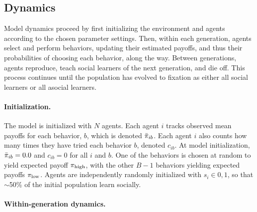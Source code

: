 \documentclass[letterpaper,11.5pt]{scrartcl}
\begin{document}
\subsection{Dynamics}

Model dynamics proceed by first initializing the environment and agents according
to the chosen parameter settings. %
Then, within each generation, agents select and perform behaviors, updating their estimated payoffs, and thus their probabilities of choosing each behavior, along the way.
Between generations, agents reproduce, teach social learners of the next generation, and die off. 
This process continues until the population has evolved to fixation as either all social learners or
all asocial learners. %


\paragraph{Initialization.}

The model is initialized with $N$ agents. Each agent $i$ tracks 
observed mean payoffs for each behavior, $b$, which is denoted $\bar\pi_{ib}$. Each
agent $i$ also counts how many times they have tried each behavior $b$, 
denoted $c_{ib}$. At model initialization, $\bar\pi_{ib} = 0.0$ and $c_{ib} = 0$ for
all $i$ and $b$.%
One of the behaviors is chosen at random to yield expected payoff $\pi_{\mathrm{high}}$, with the other $B-1$ behaviors yielding
expected payoffs $\pi_{\mathrm{low}}$. Agents are independently randomly initialized with $s_i
\in 0,1$, so that $\sim$50\% of the initial population learn socially.


\paragraph{Within-generation dynamics.}
\end{document}
